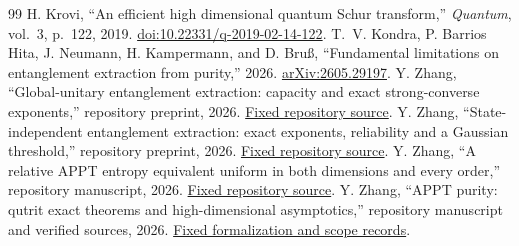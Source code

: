 \begin{thebibliography}{99}
 H. Krovi, ``An efficient high dimensional quantum Schur transform,'' \emph{Quantum}, vol.~3, p.~122, 2019. \href{https://doi.org/10.22331/q-2019-02-14-122}{doi:10.22331/q-2019-02-14-122}.
 T.~V. Kondra, P. Barrios Hita, J. Neumann, H. Kampermann, and D. Bru\ss, ``Fundamental limitations on entanglement extraction from purity,'' 2026. \href{https://arxiv.org/abs/2605.29197}{arXiv:2605.29197}.
 Y. Zhang, ``Global-unitary entanglement extraction: capacity and exact strong-converse exponents,'' repository preprint, 2026. \href{https://github.com/mxym/math/tree/44d096fe63e4b1ef9462a338b941a11ed931b790/research/global-unitary-ppt-extraction}{Fixed repository source}.
 Y. Zhang, ``State-independent entanglement extraction: exact exponents, reliability and a Gaussian threshold,'' repository preprint, 2026. \href{https://github.com/mxym/math/tree/44d096fe63e4b1ef9462a338b941a11ed931b790/research/universal-schur-extraction}{Fixed repository source}.
 Y. Zhang, ``A relative APPT entropy equivalent uniform in both dimensions and every order,'' repository manuscript, 2026. \href{https://github.com/mxym/math/tree/44d096fe63e4b1ef9462a338b941a11ed931b790/research/appt-all-dimension-entropy-profile-20261015}{Fixed repository source}.
 Y. Zhang, ``APPT purity: qutrit exact theorems and high-dimensional asymptotics,'' repository manuscript and verified sources, 2026. \href{https://github.com/mxym/math/tree/44d096fe63e4b1ef9462a338b941a11ed931b790/formalizations/appt-high-dimensional-review}{Fixed formalization and scope records}.
\end{thebibliography}
